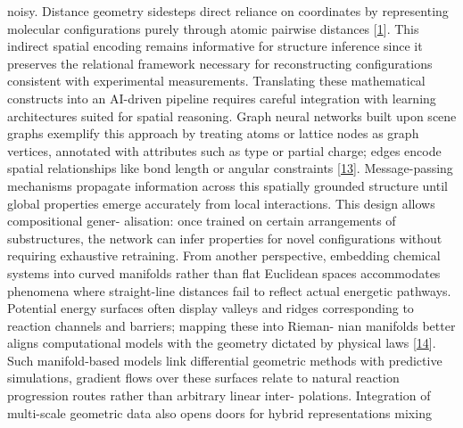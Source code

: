 \documentclass[
]{article}
\begin{document}
noisy. Distance geometry sidesteps direct reliance on coordinates by
representing molecular configurations purely through atomic pairwise
distances {[}\hyperref[_bookmark41]{1}{]}. This indirect spatial
encoding remains informative for structure inference since it preserves
the relational framework necessary for reconstructing configurations
consistent with experimental measurements. Translating these
mathematical constructs into an AI-driven pipeline requires careful
integration with learning architectures suited for spatial reasoning.
Graph neural networks built upon scene graphs exemplify this approach by
treating atoms or lattice nodes as graph vertices, annotated with
attributes such as type or partial charge; edges encode spatial
relationships like bond length or angular constraints
{[}\hyperref[_bookmark53]{13}{]}. Message-passing mechanisms propagate
information across this spatially grounded structure until global
properties emerge accurately from local interactions. This design allows
compositional gener- alisation: once trained on certain arrangements of
substructures, the network can infer properties for novel configurations
without requiring exhaustive retraining. From another perspective,
embedding chemical systems into curved manifolds rather than flat
Euclidean spaces accommodates phenomena where straight-line distances
fail to reflect actual energetic pathways. Potential energy surfaces
often display valleys and ridges corresponding to reaction channels and
barriers; mapping these into Rieman- nian manifolds better aligns
computational models with the geometry dictated by physical laws
{[}\hyperref[_bookmark54]{14}{]}. Such manifold-based models link
differential geometric methods with predictive simulations, gradient
flows over these surfaces relate to natural reaction progression routes
rather than arbitrary linear inter- polations. Integration of
multi-scale geometric data also opens doors for hybrid representations
mixing
\end{document}
